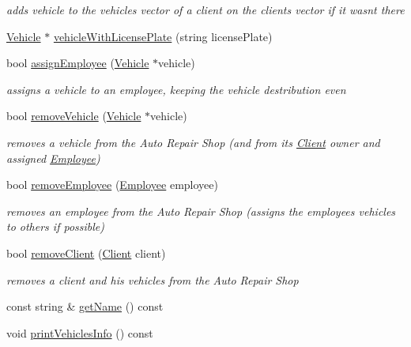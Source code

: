 \begin{DoxyCompactItemize}
\begin{DoxyCompactList}\small\item\em adds vehicle to the vehicles vector of a client on the clients vector if it wasn\textquotesingle{}t there \end{DoxyCompactList}\item 
\hyperlink{class_vehicle}{Vehicle} $\ast$ \hyperlink{class_auto_repair_shop_afe7e5e9fdfb2c2e1e672eec1702999f4}{vehicle\+With\+License\+Plate} (string license\+Plate)
\item 
bool \hyperlink{class_auto_repair_shop_ae82d112d03fae24cc106107aa427d375}{assign\+Employee} (\hyperlink{class_vehicle}{Vehicle} $\ast$vehicle)
\begin{DoxyCompactList}\small\item\em assigns a vehicle to an employee, keeping the vehicle destribution even \end{DoxyCompactList}\item 
bool \hyperlink{class_auto_repair_shop_a9a812735dd0b3ed15ac8da11809df10e}{remove\+Vehicle} (\hyperlink{class_vehicle}{Vehicle} $\ast$vehicle)
\begin{DoxyCompactList}\small\item\em removes a vehicle from the Auto Repair Shop (and from its\textquotesingle{} \hyperlink{class_client}{Client} owner and assigned \hyperlink{class_employee}{Employee}) \end{DoxyCompactList}\item 
bool \hyperlink{class_auto_repair_shop_ae823d84e1a9fe5bd91aefd574ff25a2e}{remove\+Employee} (\hyperlink{class_employee}{Employee} employee)
\begin{DoxyCompactList}\small\item\em removes an employee from the Auto Repair Shop (assigns the employees\textquotesingle{} vehicles to others if possible) \end{DoxyCompactList}\item 
bool \hyperlink{class_auto_repair_shop_a765b9c28359faeb3dec782e6347c36ec}{remove\+Client} (\hyperlink{class_client}{Client} client)
\begin{DoxyCompactList}\small\item\em removes a client and his vehicles from the Auto Repair Shop \end{DoxyCompactList}\item 
const string \& \hyperlink{class_auto_repair_shop_a5a7ae16e42c357dc05abfc14bedb8601}{get\+Name} () const 
\item 
\hypertarget{class_auto_repair_shop_a33a1e27984e3af3d2ff110348d53e1b6}{}void \hyperlink{class_auto_repair_shop_a33a1e27984e3af3d2ff110348d53e1b6}{print\+Vehicles\+Info} () const \label{class_auto_repair_shop_a33a1e27984e3af3d2ff110348d53e1b6}


\end{DoxyCompactItemize}
